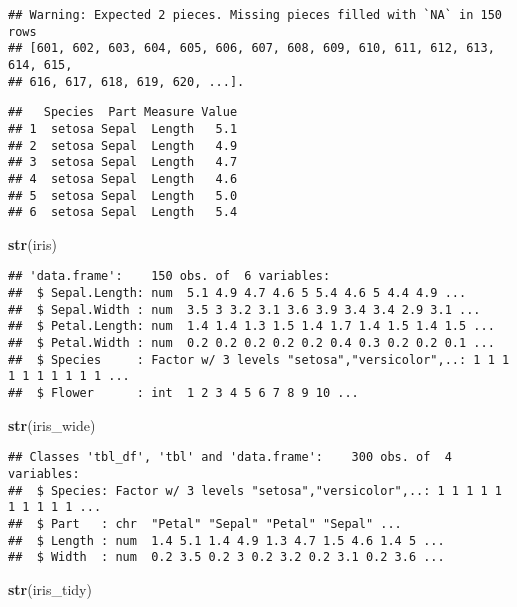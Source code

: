 \documentclass[]{article}
\newenvironment{Shaded}{\begin{snugshade}}{\end{snugshade}}
\newcommand{\KeywordTok}[1]{\textcolor[rgb]{0.13,0.29,0.53}{\textbf{#1}}}
\newcommand{\NormalTok}[1]{#1}
\begin{document}
\begin{verbatim}
## Warning: Expected 2 pieces. Missing pieces filled with `NA` in 150 rows
## [601, 602, 603, 604, 605, 606, 607, 608, 609, 610, 611, 612, 613, 614, 615,
## 616, 617, 618, 619, 620, ...].
\end{verbatim}

\begin{verbatim}
##   Species  Part Measure Value
## 1  setosa Sepal  Length   5.1
## 2  setosa Sepal  Length   4.9
## 3  setosa Sepal  Length   4.7
## 4  setosa Sepal  Length   4.6
## 5  setosa Sepal  Length   5.0
## 6  setosa Sepal  Length   5.4
\end{verbatim}

\begin{Shaded}
\begin{Highlighting}[]
\KeywordTok{str}\NormalTok{(iris)}
\end{Highlighting}
\end{Shaded}

\begin{verbatim}
## 'data.frame':    150 obs. of  6 variables:
##  $ Sepal.Length: num  5.1 4.9 4.7 4.6 5 5.4 4.6 5 4.4 4.9 ...
##  $ Sepal.Width : num  3.5 3 3.2 3.1 3.6 3.9 3.4 3.4 2.9 3.1 ...
##  $ Petal.Length: num  1.4 1.4 1.3 1.5 1.4 1.7 1.4 1.5 1.4 1.5 ...
##  $ Petal.Width : num  0.2 0.2 0.2 0.2 0.2 0.4 0.3 0.2 0.2 0.1 ...
##  $ Species     : Factor w/ 3 levels "setosa","versicolor",..: 1 1 1 1 1 1 1 1 1 1 ...
##  $ Flower      : int  1 2 3 4 5 6 7 8 9 10 ...
\end{verbatim}

\begin{Shaded}
\begin{Highlighting}[]
\KeywordTok{str}\NormalTok{(iris_wide)}
\end{Highlighting}
\end{Shaded}

\begin{verbatim}
## Classes 'tbl_df', 'tbl' and 'data.frame':    300 obs. of  4 variables:
##  $ Species: Factor w/ 3 levels "setosa","versicolor",..: 1 1 1 1 1 1 1 1 1 1 ...
##  $ Part   : chr  "Petal" "Sepal" "Petal" "Sepal" ...
##  $ Length : num  1.4 5.1 1.4 4.9 1.3 4.7 1.5 4.6 1.4 5 ...
##  $ Width  : num  0.2 3.5 0.2 3 0.2 3.2 0.2 3.1 0.2 3.6 ...
\end{verbatim}

\begin{Shaded}
\begin{Highlighting}[]
\KeywordTok{str}\NormalTok{(iris_tidy)}
\end{Highlighting}
\end{Shaded}
\end{document}

